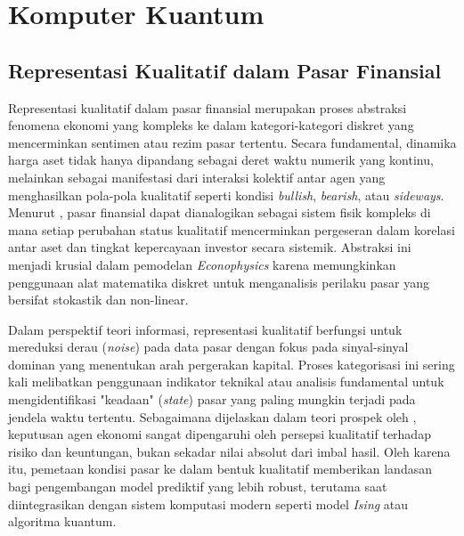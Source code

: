 \section{Komputer Kuantum}

\subsection{Representasi Kualitatif dalam Pasar Finansial}

Representasi kualitatif dalam pasar finansial merupakan proses abstraksi fenomena ekonomi yang kompleks ke dalam kategori-kategori diskret yang mencerminkan sentimen atau rezim pasar tertentu. Secara fundamental, dinamika harga aset tidak hanya dipandang sebagai deret waktu numerik yang kontinu, melainkan sebagai manifestasi dari interaksi kolektif antar agen yang menghasilkan pola-pola kualitatif seperti kondisi \textit{bullish}, \textit{bearish}, atau \textit{sideways}. Menurut \cite{mantegna_1999}, pasar finansial dapat dianalogikan sebagai sistem fisik kompleks di mana setiap perubahan status kualitatif mencerminkan pergeseran dalam korelasi antar aset dan tingkat kepercayaan investor secara sistemik. Abstraksi ini menjadi krusial dalam pemodelan \textit{Econophysics} karena memungkinkan penggunaan alat matematika diskret untuk menganalisis perilaku pasar yang bersifat stokastik dan non-linear.

Dalam perspektif teori informasi, representasi kualitatif berfungsi untuk mereduksi derau (\textit{noise}) pada data pasar dengan fokus pada sinyal-sinyal dominan yang menentukan arah pergerakan kapital. Proses kategorisasi ini sering kali melibatkan penggunaan indikator teknikal atau analisis fundamental untuk mengidentifikasi "keadaan" (\textit{state}) pasar yang paling mungkin terjadi pada jendela waktu tertentu. Sebagaimana dijelaskan dalam teori prospek oleh \cite{kahneman_1979}, keputusan agen ekonomi sangat dipengaruhi oleh persepsi kualitatif terhadap risiko dan keuntungan, bukan sekadar nilai absolut dari imbal hasil. Oleh karena itu, pemetaan kondisi pasar ke dalam bentuk kualitatif memberikan landasan bagi pengembangan model prediktif yang lebih robust, terutama saat diintegrasikan dengan sistem komputasi modern seperti model \textit{Ising} atau algoritma kuantum.

